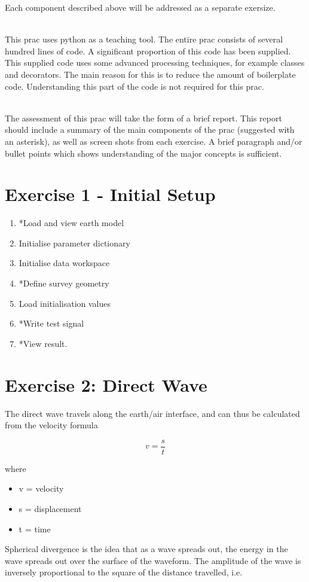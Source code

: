 \documentclass[a4paper, 10pt]{article}
\begin{document}
Each component described above will be addressed as a separate exersize.
\par~\\
This prac uses python as a teaching tool.  The entire prac consists of several hundred lines of code. A significant proportion of this code has been supplied.  This supplied code uses some advanced processing techniques, for example classes and decorators.  The main reason for this is to reduce the amount of boilerplate code.  Understanding this part of the code  is not required for this prac.  
\par~\\
The assessment of this prac will take the form of a brief report.  This report should include a summary of the main components of the prac (suggested with an asterisk), as well as screen shots from each exercise.  A brief paragraph and/or bullet points which shows understanding of the major concepts is sufficient.  

\section*{Exercise 1 - Initial Setup}
\begin{enumerate}
\item *Load and view earth model
\item Initialise parameter dictionary
\item Initialise data workspace
\item *Define survey geometry
\item Load initialisation values
\item *Write test signal
\item *View result.
\end{enumerate}


\section*{Exercise 2: Direct Wave}
The direct wave travels along the earth/air interface, and can thus be calculated from the velocity formula

\[ v = \frac{s}{t} \]

where 
\begin{itemize}
\item v = velocity
\item s = displacement
\item t = time
\end{itemize}

Spherical divergence is the idea that as a wave spreads out, the energy in the wave spreads out over the surface of the waveform. The amplitude of the wave is inversely proportional to the square of the distance travelled, i.e.
\end{document}
